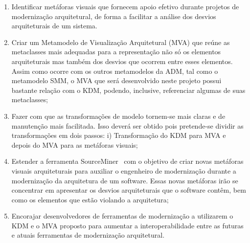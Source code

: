 \documentclass[12pt]{article}
\begin{document}
\begin{enumerate}
\item Identificar metáforas visuais que fornecem apoio efetivo durante projetos de modernização arquitetural, de forma a facilitar a análise dos desvios arquiteturais de um sistema.

\item Criar um Metamodelo de Visualização Arquitetural (MVA) que reúne as metaclasses mais adequadas para a representação não só os elementos arquiteturais mas também dos desvios que ocorrem entre esses elementos. Assim como ocorre com os outros metamodelos da ADM, tal como o metamodelo SMM, o MVA que será desenvolvido neste projeto possui bastante relação com o KDM, podendo, inclusive, referenciar algumas de suas metaclasses;

\item Fazer com que as transformações de modelo tornem-se mais claras e de manutenção mais facilitada. Isso deverá ser obtido pois pretende-se dividir as transformações em dois passos: i) Transformação do KDM para MVA e depois do MVA para as metáforas visuais;

\item Estender a ferramenta SourceMiner~\cite{source_miner_glauco} com o objetivo de criar novas metáforas visuais arquiteturais para auxiliar o engenheiro de modernização durante a modernização da arquitetura de um software. Essas novas metáforas irão se concentrar em apresentar os desvios arquiteturais que o software contêm, bem como os elementos que estão violando a arquitetura; 

\item Encorajar desenvolvedores de ferramentas de modernização a utilizarem o KDM e o MVA proposto para aumentar a interoperabilidade entre as futuras e atuais ferramentas de modernização arquitetural.

\end{enumerate}



\end{document}
